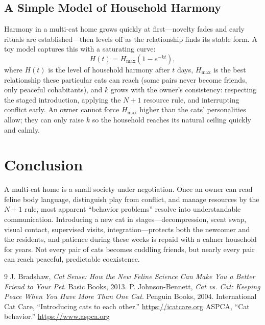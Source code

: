 \documentclass[12pt,a4paper]{article}
\begin{document}
\subsection{A Simple Model of Household Harmony}
Harmony in a multi-cat home grows quickly at first---novelty fades and early rituals
are established---then levels off as the relationship finds its stable form. A toy
model captures this with a saturating curve:
\begin{equation}
H(t) = H_{\max}\left(1 - e^{-kt}\right),
\label{eq:harmony}
\end{equation}
where $H(t)$ is the level of household harmony after $t$ days, $H_{\max}$ is the best
relationship these particular cats can reach (some pairs never become friends, only
peaceful cohabitants), and $k$ grows with the owner's consistency: respecting the staged
introduction, applying the $N+1$ resource rule, and interrupting conflict early. An
owner cannot force $H_{\max}$ higher than the cats' personalities allow; they can only
raise $k$ so the household reaches its natural ceiling quickly and calmly.

\section{Conclusion}
A multi-cat home is a small society under negotiation. Once an owner can read feline
body language, distinguish play from conflict, and manage resources by the $N+1$ rule,
most apparent ``behavior problems'' resolve into understandable communication.
Introducing a new cat in stages---decompression, scent swap, visual contact, supervised
visits, integration---protects both the newcomer and the residents, and patience during
these weeks is repaid with a calmer household for years. Not every pair of cats becomes
cuddling friends, but nearly every pair can reach peaceful, predictable coexistence.

\begin{thebibliography}{9}
 J. Bradshaw, \emph{Cat Sense: How the New Feline Science Can Make
You a Better Friend to Your Pet}. Basic Books, 2013.
 P. Johnson-Bennett, \emph{Cat vs. Cat: Keeping Peace When You Have
More Than One Cat}. Penguin Books, 2004.
 International Cat Care, ``Introducing cats to each other.''
\url{https://icatcare.org}
 ASPCA, ``Cat behavior.'' \url{https://www.aspca.org}
\end{thebibliography}
\end{document}
